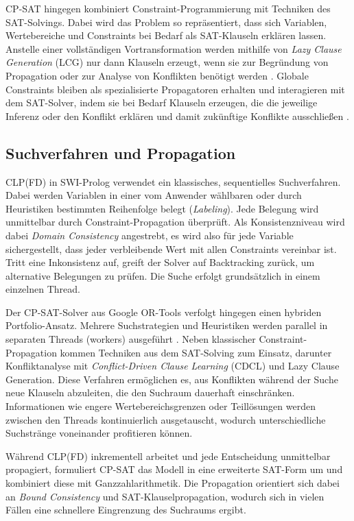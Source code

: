 \documentclass[12pt,a4paper]{article}
\begin{document}
CP-SAT hingegen kombiniert Constraint-Programmierung mit Techniken des SAT-Solvings.
Dabei wird das Problem so repräsentiert, dass sich Variablen, Wertebereiche und Constraints bei Bedarf als SAT-Klauseln erklären lassen.
Anstelle einer vollständigen Vortransformation werden mithilfe von \emph{Lazy Clause Generation} (LCG) nur dann Klauseln erzeugt, wenn sie zur Begründung von Propagation oder zur Analyse von Konflikten benötigt werden \cite{Stuckey2010}.
Globale Constraints bleiben als spezialisierte Propagatoren erhalten und interagieren mit dem SAT-Solver, indem sie bei Bedarf Klauseln erzeugen, die die jeweilige Inferenz oder den Konflikt erklären und damit zukünftige Konflikte ausschließen \cite{cp-sat-primer}.



\subsection{Suchverfahren und Propagation}
\label{sec:search_prop}
CLP(FD) in SWI-Prolog verwendet ein klassisches, sequentielles Suchverfahren.
Dabei werden Variablen in einer vom Anwender wählbaren oder durch Heuristiken bestimmten Reihenfolge belegt (\emph{Labeling}).
Jede Belegung wird unmittelbar durch Constraint-Propagation überprüft.
Als Konsistenzniveau wird dabei \emph{Domain Consistency} angestrebt, es wird also für jede Variable sichergestellt, dass jeder verbleibende Wert mit allen Constraints vereinbar ist.
Tritt eine Inkonsistenz auf, greift der Solver auf Backtracking zurück, um alternative Belegungen zu prüfen.
Die Suche erfolgt grundsätzlich in einem einzelnen Thread.

Der CP-SAT-Solver aus Google OR-Tools verfolgt hingegen einen hybriden Portfolio-Ansatz.
Mehrere Suchstrategien und Heuristiken werden parallel in separaten Threads (workers) ausgeführt \cite{perron}.
Neben klassischer Constraint-Propagation kommen Techniken aus dem SAT-Solving zum Einsatz, darunter Konfliktanalyse mit \emph{Conflict-Driven Clause Learning} (CDCL) und Lazy Clause Generation.
Diese Verfahren ermöglichen es, aus Konflikten während der Suche neue Klauseln abzuleiten, die den Suchraum dauerhaft einschränken.
Informationen wie engere Wertebereichsgrenzen oder Teillösungen werden zwischen den Threads kontinuierlich ausgetauscht, wodurch unterschiedliche Suchstränge voneinander profitieren können. 

Während CLP(FD) inkrementell arbeitet und jede Entscheidung unmittelbar propagiert, formuliert CP-SAT das Modell in eine erweiterte SAT-Form um und kombiniert diese mit Ganzzahlarithmetik.
Die Propagation orientiert sich dabei an \emph{Bound Consistency} und SAT-Klauselpropagation, wodurch sich in vielen Fällen eine schnellere Eingrenzung des Suchraums ergibt.
\end{document}
